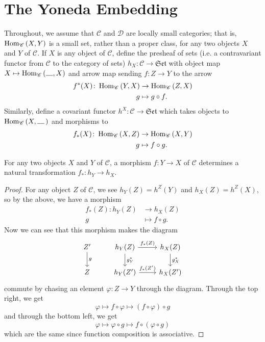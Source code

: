 \documentclass[dissertation.tex]{subfiles}
\begin{document}
\section{The Yoneda Embedding}
Throughout, we assume that $\mathscr{C}$ and $\mathscr{D}$ are locally small categories; that is, $\operatorname{Hom}_{\mathscr{C}}\left(X,Y\right)$ is a small set, rather than a proper class, for any two objects $X$ and $Y$ of $\mathscr{C}$.
If $X$ is any object of $\mathscr{C}$, define the presheaf of sets (i.e. a contravariant functor from $\mathscr{C}$ to the category of sets) $h_X \colon \mathscr{C} \rightarrow \mathfrak{Set}$ with object map $X \mapsto \Hom{\mathscr{C}}{\line(1,0){10}, X}$ and arrow map sending $f : Z \rightarrow Y$ to the arrow
\begin{align*}
  f^*(X) \colon \operatorname{Hom}_{\mathscr{C}}\left(Y,X\right) &\rightarrow \operatorname{Hom}_{\mathscr{C}}\left(Z,X\right)\\
  g &\mapsto g \circ f.
\end{align*}
Similarly, define a covariant functor $h^X : \mathscr{C} \rightarrow \mathfrak{Set}$ which takes objects to $\Hom{\mathscr{C}}{X,\, \line(1,0){10}}$ and morphisms to
\begin{align*}
  f_*(X) \colon \operatorname{Hom}_{\mathscr{C}}\left(X,Z\right) &\rightarrow \operatorname{Hom}_{\mathscr{C}}\left(X,Y\right)\\
  g &\mapsto f \circ g.
\end{align*}

\begin{prop}\label{p.1}
  For any two objects $X$ and $Y$ of $\mathscr{C}$, a morphism $f : Y \rightarrow X$ of $\mathscr{C}$ determines a natural transformation $f_* : h_Y \rightarrow h_X$.
  
  \begin{proof}
    For any object $Z$ of $\mathscr{C}$, we see $h_Y(Z) = h^Z(Y)$ and $h_X(Z) = h^Z(X)$, so by the above, we have a morphism
    \begin{align*}
      f_*(Z) \colon h_Y(Z) &\rightarrow h_X(Z)\\
      g &\mapsto f \circ g.
    \end{align*}
    Now we can see that this morphism makes the diagram
    $$\begin{tikzcd}
      Z^\prime\arrow{d}{g} & h_Y(Z)\arrow{d}{g^*_Y}\arrow{r}{f_*(Z)} & h_X(Z)\arrow{d}{g^*_{X}}\\ 
      Z & h_Y(Z^\prime) \arrow{r}{f_*(Z^\prime)} &  h_X(Z^\prime)
    \end{tikzcd}$$
    commute by chasing an element $\varphi : Z \rightarrow Y$ through the diagram.
    Through the top right, we get
    $$\varphi \mapsto f \circ \varphi \mapsto (f \circ \varphi) \circ g $$
    and through the bottom left, we get
    $$\varphi \mapsto \varphi \circ g \mapsto f \circ (\varphi \circ g) $$
    which are the same since function composition is associative.
  \end{proof}
\end{prop}
\end{document}
